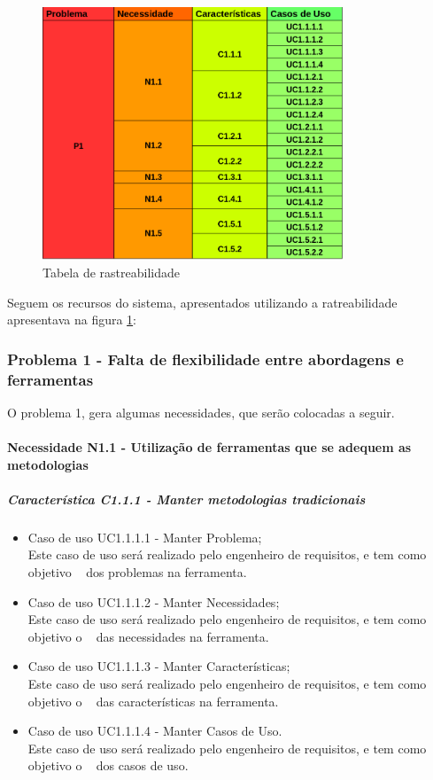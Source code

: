 \begin{figure}[H]
	\centering
	\includegraphics[width=0.8\textwidth]{imgModelagem/tabelaRastreabilidade}
	\caption{Tabela de rastreabilidade}
	\label{img:tabelaRastreabilidade}
\end{figure}

Seguem os recursos do sistema, apresentados utilizando a ratreabilidade apresentava na figura \ref{img:tabelaRastreabilidade}:

\subsubsection{Problema 1 - Falta de flexibilidade entre abordagens e ferramentas}

O problema 1, gera algumas necessidades, que serão colocadas a seguir.

\paragraph{Necessidade N1.1 - Utilização de ferramentas que se adequem as metodologias}

	\subparagraph{Característica C1.1.1 - Manter metodologias tradicionais}
		\begin{itemize}
			\item Caso de uso UC1.1.1.1 - Manter Problema;\\
				Este caso de uso será realizado pelo engenheiro de requisitos, e tem como objetivo \CRUD~ dos problemas na ferramenta.
			\item Caso de uso UC1.1.1.2 - Manter Necessidades;\\
				Este caso de uso será realizado pelo engenheiro de requisitos, e tem como objetivo o \CRUD~ das necessidades na ferramenta.
			\item Caso de uso UC1.1.1.3 - Manter Características;\\
				Este caso de uso será realizado pelo engenheiro de requisitos, e tem como objetivo o \CRUD~ das características na ferramenta.
			\item Caso de uso UC1.1.1.4 - Manter Casos de Uso.\\
				Este caso de uso será realizado pelo engenheiro de requisitos, e tem como objetivo o \CRUD~ dos casos de uso.
		\end{itemize}
	
